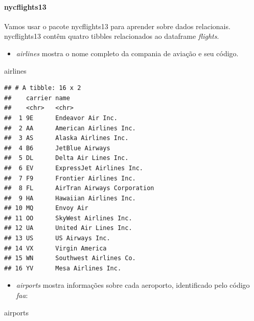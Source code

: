 \documentclass[
]{article}
\newenvironment{Shaded}{\begin{snugshade}}{\end{snugshade}}
\newcommand{\NormalTok}[1]{#1}
\providecommand{\tightlist}{%
  \setlength{\itemsep}{0pt}\setlength{\parskip}{0pt}}
\begin{document}
\hypertarget{nycflights13}{%
\paragraph{nycflights13}\label{nycflights13}}

Vamos usar o pacote nycflights13 para aprender sobre dados relacionais.
nycflights13 contêm quatro tibbles relacionados ao dataframe
\emph{flights}.

\begin{itemize}
\tightlist
\item
  \emph{airlines} mostra o nome completo da compania de aviação e seu
  código.
\end{itemize}

\begin{Shaded}
\begin{Highlighting}[]
\NormalTok{airlines}
\end{Highlighting}
\end{Shaded}

\begin{verbatim}
## # A tibble: 16 x 2
##    carrier name                       
##    <chr>   <chr>                      
##  1 9E      Endeavor Air Inc.          
##  2 AA      American Airlines Inc.     
##  3 AS      Alaska Airlines Inc.       
##  4 B6      JetBlue Airways            
##  5 DL      Delta Air Lines Inc.       
##  6 EV      ExpressJet Airlines Inc.   
##  7 F9      Frontier Airlines Inc.     
##  8 FL      AirTran Airways Corporation
##  9 HA      Hawaiian Airlines Inc.     
## 10 MQ      Envoy Air                  
## 11 OO      SkyWest Airlines Inc.      
## 12 UA      United Air Lines Inc.      
## 13 US      US Airways Inc.            
## 14 VX      Virgin America             
## 15 WN      Southwest Airlines Co.     
## 16 YV      Mesa Airlines Inc.
\end{verbatim}

\begin{itemize}
\tightlist
\item
  \emph{airports} mostra informações sobre cada aeroporto, identificado
  pelo código \emph{faa}:
\end{itemize}

\begin{Shaded}
\begin{Highlighting}[]
\NormalTok{airports}
\end{Highlighting}
\end{Shaded}
\end{document}
